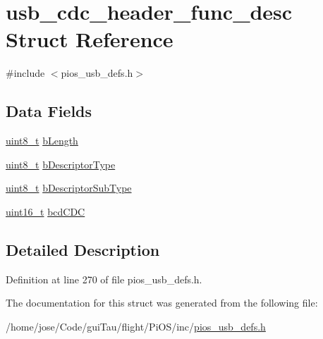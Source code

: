 \hypertarget{structusb__cdc__header__func__desc}{\section{usb\-\_\-cdc\-\_\-header\-\_\-func\-\_\-desc Struct Reference}
\label{structusb__cdc__header__func__desc}
}


{\ttfamily \#include $<$pios\-\_\-usb\-\_\-defs.\-h$>$}

\subsection*{Data Fields}
\begin{DoxyCompactItemize}
\item 
\hyperlink{stdint_8h_aba7bc1797add20fe3efdf37ced1182c5}{uint8\-\_\-t} \hyperlink{group___p_i_o_s___u_s_b___d_e_f_s_ga15e505dd53db0e081c58b58f3fcd1ae0}{b\-Length}
\item 
\hyperlink{stdint_8h_aba7bc1797add20fe3efdf37ced1182c5}{uint8\-\_\-t} \hyperlink{group___p_i_o_s___u_s_b___d_e_f_s_ga09d781c982c0be7203ec0922f818350d}{b\-Descriptor\-Type}
\item 
\hyperlink{stdint_8h_aba7bc1797add20fe3efdf37ced1182c5}{uint8\-\_\-t} \hyperlink{group___p_i_o_s___u_s_b___d_e_f_s_ga9bdb88cd9eb6973d4b508010df9d45ff}{b\-Descriptor\-Sub\-Type}
\item 
\hyperlink{stdint_8h_a273cf69d639a59973b6019625df33e30}{uint16\-\_\-t} \hyperlink{group___p_i_o_s___u_s_b___d_e_f_s_gaedee5ac39032e71dd0837e37f480a398}{bcd\-C\-D\-C}
\end{DoxyCompactItemize}


\subsection{Detailed Description}


Definition at line 270 of file pios\-\_\-usb\-\_\-defs.\-h.



The documentation for this struct was generated from the following file\-:\begin{DoxyCompactItemize}
\item 
/home/jose/\-Code/gui\-Tau/flight/\-Pi\-O\-S/inc/\hyperlink{pios__usb__defs_8h}{pios\-\_\-usb\-\_\-defs.\-h}\end{DoxyCompactItemize}
